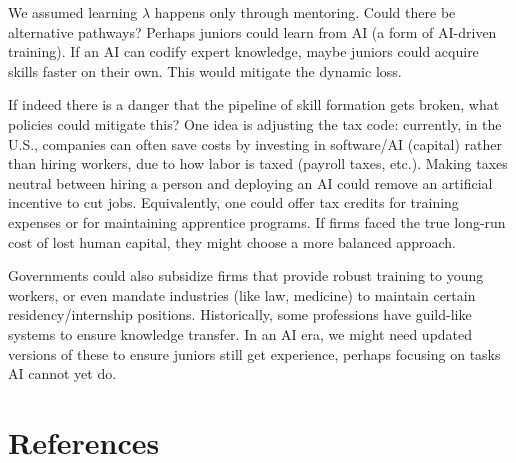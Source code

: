 \documentclass[12pt]{article}
\begin{document}
{We assumed learning \(\lambda\) happens only through mentoring. Could
there be alternative pathways? Perhaps juniors could learn from AI (a
form of AI-driven training). If an AI can codify expert knowledge,
maybe juniors could acquire skills faster on their own. This would
mitigate the dynamic loss. 

If indeed there is a danger that the
pipeline of skill formation gets broken, what policies could mitigate
this? One idea is adjusting the {tax code}: currently, in the U.S., companies
can often save costs by investing in software/AI (capital) rather
than hiring workers, due to how labor is taxed (payroll taxes,
etc.). Making taxes neutral between hiring a person and deploying an
AI could remove an artificial incentive to cut jobs. Equivalently,
one could offer tax credits for training expenses or for maintaining
apprentice programs. If firms faced the true long-run cost of lost
human capital, they might choose a more balanced approach.

Governments could also
subsidize firms that provide robust training to young workers, or
even mandate industries (like law, medicine) to maintain certain
residency/internship positions. Historically, some professions have
{guild-like systems} to ensure knowledge transfer. In an AI
era, we might need updated versions of these to ensure juniors still
get experience, perhaps focusing on tasks AI cannot yet do.


\section*{References}\label{references}

}
\end{document}
